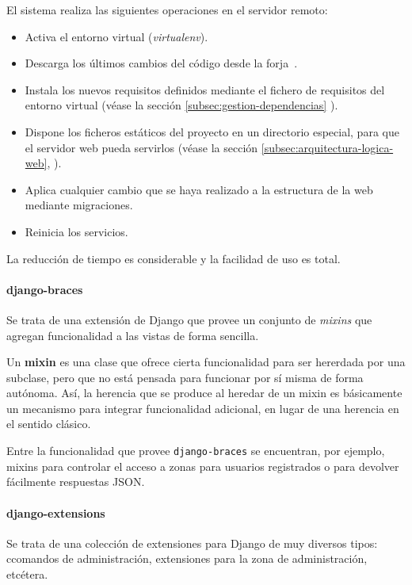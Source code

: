 El sistema realiza las siguientes operaciones en el servidor remoto:

\begin{itemize}
\item Activa el entorno virtual (\textit{virtualenv}).
\item Descarga los últimos cambios del código desde la forja~\cite{forja}.
\item Instala los nuevos requisitos definidos mediante el fichero de requisitos
  del entorno virtual (véase la sección \ref{subsec:gestion-dependencias}
  \textit{}).
\item Dispone los ficheros estáticos del proyecto en un directorio especial,
  para que el servidor web pueda servirlos (véase la sección
  \ref{subsec:arquitectura-logica-web}, \textit{}).
\item Aplica cualquier cambio que se haya realizado a la estructura de la web
  mediante migraciones.
\item Reinicia los servicios.
\end{itemize}

La reducción de tiempo es considerable y la facilidad de uso es total.

\paragraph{django-braces}

Se trata de una extensión de Django que provee un conjunto de \textit{mixins}
que agregan funcionalidad a las vistas de forma sencilla. 

Un \textbf{mixin} es una clase que ofrece cierta funcionalidad para ser
hererdada por una subclase, pero que no está pensada para funcionar por sí misma
de forma autónoma. Así, la herencia que se produce al heredar de un mixin es
básicamente un mecanismo para integrar funcionalidad adicional, en lugar de una
herencia en el sentido clásico. 

Entre la funcionalidad que provee \texttt{django-braces} se encuentran, por
ejemplo, mixins para controlar el acceso a zonas para usuarios registrados o
para devolver fácilmente respuestas JSON.

\paragraph{django-extensions}

Se trata de una colección de extensiones para Django de muy diversos tipos:
ccomandos de administración, extensiones para la zona de administración,
etcétera.

